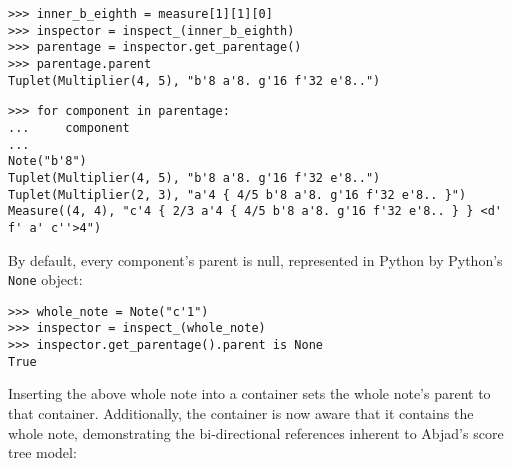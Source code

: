 \begin{abjadbookoutput}
\begin{singlespacing}
\vspace{-0.5\baselineskip}
\begin{lstlisting}
>>> inner_b_eighth = measure[1][1][0]
>>> inspector = inspect_(inner_b_eighth)
>>> parentage = inspector.get_parentage()
>>> parentage.parent
Tuplet(Multiplier(4, 5), "b'8 a'8. g'16 f'32 e'8..")
\end{lstlisting}
\begin{lstlisting}
>>> for component in parentage:
...     component
...
Note("b'8")
Tuplet(Multiplier(4, 5), "b'8 a'8. g'16 f'32 e'8..")
Tuplet(Multiplier(2, 3), "a'4 { 4/5 b'8 a'8. g'16 f'32 e'8.. }")
Measure((4, 4), "c'4 { 2/3 a'4 { 4/5 b'8 a'8. g'16 f'32 e'8.. } } <d' f' a' c''>4")
\end{lstlisting}
\end{singlespacing}
\end{abjadbookoutput}

\noindent By default, every component's parent is null, represented in Python
by Python's \texttt{None} object:

\begin{comment}
<abjad>
whole_note = Note("c'1")
inspector = inspect_(whole_note)
inspector.get_parentage().parent is None
</abjad>
\end{comment}

\begin{abjadbookoutput}
\begin{singlespacing}
\vspace{-0.5\baselineskip}
\begin{lstlisting}
>>> whole_note = Note("c'1")
>>> inspector = inspect_(whole_note)
>>> inspector.get_parentage().parent is None
True
\end{lstlisting}
\end{singlespacing}
\end{abjadbookoutput}

\noindent Inserting the above whole note into a container sets the whole note's
parent to that container. Additionally, the container is now aware that it
contains the whole note, demonstrating the bi-directional references inherent
to Abjad's score tree model:

\begin{comment}
<abjad>
container_one = Container()
container_one.append(whole_note)
inspector.get_parentage().parent is container_one
whole_note in container_one
print(format(container_one))
</abjad>
\end{comment}

